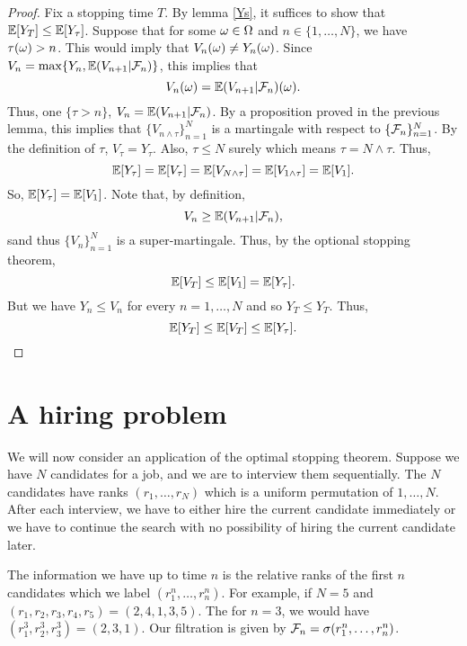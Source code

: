 \begin{proof}
    Fix a stopping time $T$.  By lemma \eqref{Ys}, it suffices to show that ${\mathbb{E}}[Y_T] \le {\mathbb{E}}[Y_\tau]$. Suppose that for some ${\omega} \in {{\Omega}}$ and $n \in \{1,\ldots,N\}$, we have $\tau({\omega}) > n$. This would imply that $V_n({\omega})  \neq Y_n({\omega})$. Since $V_n = \max\{Y_n, {\mathbb{E}}(V_{n+1}|{\mathcal{F}}_n)\}$, this implies that
    \[V_n({\omega}) = {\mathbb{E}}(V_{n+1}|{\mathcal{F}}_n)({\omega}). \]
    Thus, one $\{\tau > n\}$, $V_n = {\mathbb{E}}(V_{n+1}|{\mathcal{F}}_n)$. By a proposition proved in the previous lemma, this implies that $\{V_{n \land \tau}\}_{n=1}^N$ is a martingale with respect to $\{{\mathcal{F}}_n\}_{n=1}^N$. By the definition of $\tau$, $V_\tau = Y_\tau$. Also, $\tau \le N$ surely which means $\tau = N \land \tau$. Thus,
    \[{\mathbb{E}}[Y_\tau] = {\mathbb{E}}[V_\tau] = {\mathbb{E}}[V_{N\land \tau}] = {\mathbb{E}}[V_{1\land \tau}] = {\mathbb{E}}[V_1]. \]
    So, ${\mathbb{E}}[Y_\tau] = {\mathbb{E}}[V_1]$. Note that, by definition,
    \[V_n \ge {\mathbb{E}}(V_{n+1}|{\mathcal{F}}_n), \]
    sand thus $\{V_n\}_{n=1}^N$ is a super-martingale. Thus, by the optional stopping theorem,
    \[{\mathbb{E}}[V_T] \le {\mathbb{E}}[V_1] = {\mathbb{E}}[Y_\tau]. \]
    But we have $Y_n \le V_n$ for every $n =1,\ldots,N$ and so $Y_T \le Y_T$. Thus,
    \[{\mathbb{E}}[Y_T]\le{\mathbb{E}}[V_T]\le{\mathbb{E}}[Y_\tau].\qedhere \]
\end{proof}
\section{A hiring problem}
We will now consider an application of the optimal stopping theorem. Suppose we have $N$ candidates for a job, and we are to interview them sequentially. The $N$ candidates have ranks $(r_1,\ldots,r_N)$ which is a uniform permutation of $1,\ldots,N$. After each interview, we have to either hire the current candidate immediately or we have to continue the search with no possibility of hiring the current candidate later.

The information we have up to time $n$ is the relative ranks of the first $n$ candidates which we label $(r_1^n,\ldots, r_n^n)$. For example, if $N=5$ and $(r_1,r_2,r_3,r_4,r_5)= (2,4,1,3,5)$. The for $n=3$, we would have $(r_1^3, r_2^3, r_3^3)= (2,3,1)$. Our filtration is given by ${\mathcal{F}}_n = \sigma(r_1^n,\ldots, r_n^n)$. 

